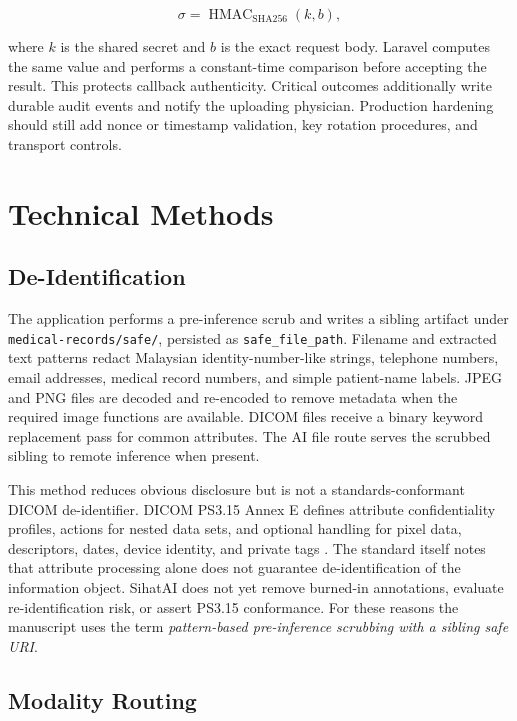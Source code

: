 \documentclass[conference]{IEEEtran}
\begin{document}
\begin{equation}
    \sigma = \operatorname{HMAC}_{\mathrm{SHA256}}(k, b),
\end{equation}

where \(k\) is the shared secret and \(b\) is the exact request body. Laravel computes the same value and performs a constant-time comparison before accepting the result. This protects callback authenticity. Critical outcomes additionally write durable audit events and notify the uploading physician. Production hardening should still add nonce or timestamp validation, key rotation procedures, and transport controls.

\section{Technical Methods}

\subsection{De-Identification}

The application performs a pre-inference scrub and writes a sibling artifact under \texttt{medical-records/safe/}, persisted as \texttt{safe\_file\_path}. Filename and extracted text patterns redact Malaysian identity-number-like strings, telephone numbers, email addresses, medical record numbers, and simple patient-name labels. JPEG and PNG files are decoded and re-encoded to remove metadata when the required image functions are available. DICOM files receive a binary keyword replacement pass for common attributes. The AI file route serves the scrubbed sibling to remote inference when present.

This method reduces obvious disclosure but is not a standards-conformant DICOM de-identifier. DICOM PS3.15 Annex E defines attribute confidentiality profiles, actions for nested data sets, and optional handling for pixel data, descriptors, dates, device identity, and private tags \cite{dicom2026ps315}. The standard itself notes that attribute processing alone does not guarantee de-identification of the information object. SihatAI does not yet remove burned-in annotations, evaluate re-identification risk, or assert PS3.15 conformance. For these reasons the manuscript uses the term \emph{pattern-based pre-inference scrubbing with a sibling safe URI}.

\subsection{Modality Routing}
\end{document}
